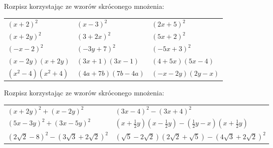 \documentclass[12pt,a4paper]{article}
\theoremstyle{break}
\begin{document}
	\begin{zad}
		Rozpisz korzystając ze wzorów skróconego mnożenia:
	\end{zad}
	\begin{enumerate}[a)] \begin{tabular}{p{5cm} p{5cm} p{5cm}} 
			\item $(x+2)^2$ & \vspace{0.25cm}\item$(x-3)^2$ &\vspace{0.25cm}\item $(2x+5)^2$\\
			\item $(x+2y)^2$ & \item $(3+2x)^2$ &\item $(5x+2)^2$\\
			\item $(-x-2)^2$ & \item $(-3y+7)^2$ &\item $(-5x+3)^2$\\
			\item $(x-2y)(x+2y)$ & \item $(3x+1)(3x-1)$ &\item $(4+5x)(5x-4)$\\
			\item $(x^2-4)(x^2+4)$ & \item $(4a+7b)(7b-4a)$ &\item $(-x-2y)(2y-x)$\\
	\end{tabular} \end{enumerate}
\newpage
	\begin{zad}
		Rozpisz korzystając ze wzorów skróconego mnożenia:
	\end{zad}

		\begin{enumerate}[a)] \begin{tabular}{p{8cm} p{8cm}} 
			\item $(x+2y)^2+(x-2y)^2$ & \vspace{0.25cm}\item$(3x-4)^2-(3x+4)^2$ \\
			\item $(5x-3y)^2+(3x-5y)^2$ & \item $(x+\frac{1}{2}y)(x-\frac{1}{2}y)-(\frac{1}{2}y-x)(x+\frac{1}{2}y)$ \\
			\item $(2\sqrt{2}-8)^2-(3\sqrt{3}+2\sqrt{2})^2$ & \item $(\sqrt{5}-2\sqrt{2})(2\sqrt{2}+\sqrt{5})-(4\sqrt{3}+2\sqrt{2})^2$ \\
	\end{tabular} \end{enumerate}
\end{document}
